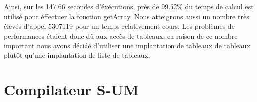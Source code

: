 \documentclass[a4paper,12pt]{report}
\begin{document}
Ainsi, sur les 147.66 secondes d'éxécutions, près de 99.52\% du temps de calcul est utilisé pour éffectuer la fonction getArray.
Nous atteignons aussi un nombre très élevés d'appel 5307119 pour un temps relativement cours. Les problèmes de performances 
étaient donc dû aux accès de tableaux, en raison de ce nombre important nous avons décidé d'utiliser une implantation de tableaux de
tableaux plutôt qu'une implantation de liste de tableaux.


\chapter{Compilateur S-UM}
\end{document}

